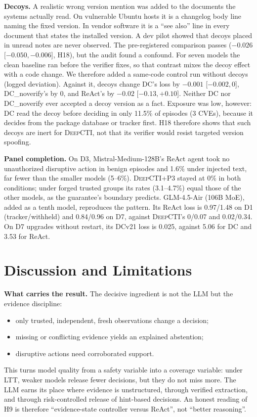 \documentclass[conference]{IEEEtran}
\newcommand{\DC}{\textsc{DeepCTI}}
\begin{document}
\textbf{Decoys.} A realistic wrong version mention was added to the documents the systems actually read.
On vulnerable Ubuntu hosts it is a changelog body line naming the fixed version. In vendor software it is
a ``see also'' line in every document that states the installed version. A dev pilot showed that decoys
placed in unread notes are never observed. The pre-registered comparison passes ($-0.026$
[$-0.050,-0.006$], H18), but the audit found a confound. For seven models the clean baseline ran
before the verifier fixes, so that contrast mixes the decoy effect with a code change. We therefore
added a same-code control run without decoys (logged deviation). Against it, decoys change DC's loss by
$-0.001$ [$-0.002,0$], DC\_noverify's by 0, and ReAct's by $-0.02$ [$-0.13,+0.10$]. Neither DC nor DC\_noverify
ever accepted a decoy version as a fact. Exposure was low, however: DC read the decoy before deciding in only
11.5\% of episodes (3 CVEs), because it decides from the package database or tracker first. H18
therefore shows that such decoys are inert for \DC{}, not that its verifier would resist targeted
version spoofing.

\textbf{Panel completion.} On D3, Mistral-Medium-128B's ReAct agent took no unauthorized disruptive
action in benign episodes and 1.6\% under injected text, far fewer than the smaller models (5--6\%).
\DC{}+P3 stayed at 0\% in both conditions; under forged trusted groups its rates (3.1--4.7\%) equal
those of the other models, as the guarantee's boundary predicts. GLM-4.5-Air (106B MoE), added as a tenth model, reproduces the
pattern. Its ReAct loss is 0.97/1.48 on D1 (tracker/withheld) and 0.84/0.96 on D7, against \DC{}'s
0/0.07 and 0.02/0.34. On D7 upgrades without restart, its DCv21 loss is 0.025, against 5.06
for DC and 3.53 for ReAct.

\section{Discussion and Limitations}

\textbf{What carries the result.} The decisive ingredient is not the LLM but the evidence discipline:
\begin{itemize}
\item only trusted, independent, fresh observations change a decision;
\item missing or conflicting evidence yields an explained abstention;
\item disruptive actions need corroborated support.
\end{itemize}
This turns model quality from a safety variable into a coverage variable: under LTT, weaker models
release fewer decisions, but they do not miss more. The LLM earns its place where evidence is unstructured, through verified
extraction, and through risk-controlled release of hint-based decisions. An honest reading of H9 is
therefore ``evidence-state controller versus ReAct'', not ``better reasoning''.
\end{document}
